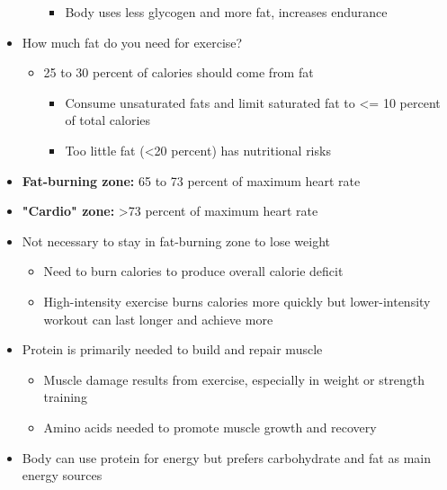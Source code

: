 \documentclass[12pt]{article}
\begin{document}
\begin{itemize}
\begin{itemize}
                            \begin{itemize}
                                \item Body uses less glycogen and more fat, increases endurance
                            \end{itemize}
                    \end{itemize}
                \item How much fat do you need for exercise?
                    \begin{itemize}
                        \item 25 to 30 percent of calories should come from fat
                            \begin{itemize}
                                \item Consume unsaturated fats and limit saturated fat to <= 10 percent of total calories
                                \item Too little fat (<20 percent) has nutritional risks
                            \end{itemize}
                    \end{itemize}
                \item \textbf{Fat-burning zone:} 65 to 73 percent of maximum heart rate
                \item \textbf{"Cardio" zone:} >73 percent of maximum heart rate
                \item Not necessary to stay in fat-burning zone to lose weight
                    \begin{itemize}
                        \item Need to burn calories to produce overall calorie deficit
                        \item High-intensity exercise burns calories more quickly but lower-intensity workout can last longer and achieve more
                    \end{itemize}
                \item Protein is primarily needed to build and repair muscle
                    \begin{itemize}
                        \item Muscle damage results from exercise, especially in weight or strength training
                        \item Amino acids needed to promote muscle growth and recovery
                    \end{itemize}
                \item Body can use protein for energy but prefers carbohydrate and fat as main energy sources

\end{itemize}
\end{document}
